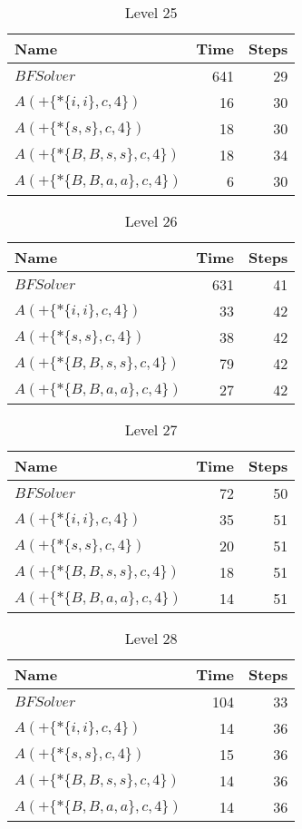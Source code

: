 \begin{table} \centering \begin{tabular}{lrr}\toprule \textbf{ Name }
    & \textbf{ Time } & \textbf{ Steps }\\\midrule
    $BFSolver$ & 641 & 29 \\
    $A(+\{*\{i,i\},c,4\})$ & 16 & 30 \\
    $A(+\{*\{s,s\},c,4\})$ & 18 & 30 \\
    $A(+\{*\{B,B,s,s\},c,4\})$ & 18 & 34 \\
    $A(+\{*\{B,B,a,a\},c,4\})$ & 6 & 30 \\
    \bottomrule \end{tabular} \caption{Level 25}
  \label{tab:level_25} \end{table}

\begin{table} \centering \begin{tabular}{lrr}\toprule \textbf{ Name }
    & \textbf{ Time } & \textbf{ Steps }\\\midrule
    $BFSolver$ & 631 & 41 \\
    $A(+\{*\{i,i\},c,4\})$ & 33 & 42 \\
    $A(+\{*\{s,s\},c,4\})$ & 38 & 42 \\
    $A(+\{*\{B,B,s,s\},c,4\})$ & 79 & 42 \\
    $A(+\{*\{B,B,a,a\},c,4\})$ & 27 & 42 \\
    \bottomrule \end{tabular} \caption{Level 26}
  \label{tab:level_26} \end{table}

\begin{table} \centering \begin{tabular}{lrr}\toprule \textbf{ Name }
    & \textbf{ Time } & \textbf{ Steps }\\\midrule
    $BFSolver$ & 72 & 50 \\
    $A(+\{*\{i,i\},c,4\})$ & 35 & 51 \\
    $A(+\{*\{s,s\},c,4\})$ & 20 & 51 \\
    $A(+\{*\{B,B,s,s\},c,4\})$ & 18 & 51 \\
    $A(+\{*\{B,B,a,a\},c,4\})$ & 14 & 51 \\
    \bottomrule \end{tabular} \caption{Level 27}
  \label{tab:level_27} \end{table}

\begin{table} \centering \begin{tabular}{lrr}\toprule \textbf{ Name }
    & \textbf{ Time } & \textbf{ Steps }\\\midrule
    $BFSolver$ & 104 & 33 \\
    $A(+\{*\{i,i\},c,4\})$ & 14 & 36 \\
    $A(+\{*\{s,s\},c,4\})$ & 15 & 36 \\
    $A(+\{*\{B,B,s,s\},c,4\})$ & 14 & 36 \\
    $A(+\{*\{B,B,a,a\},c,4\})$ & 14 & 36 \\
    \bottomrule \end{tabular} \caption{Level 28}
  \label{tab:level_28} \end{table}

